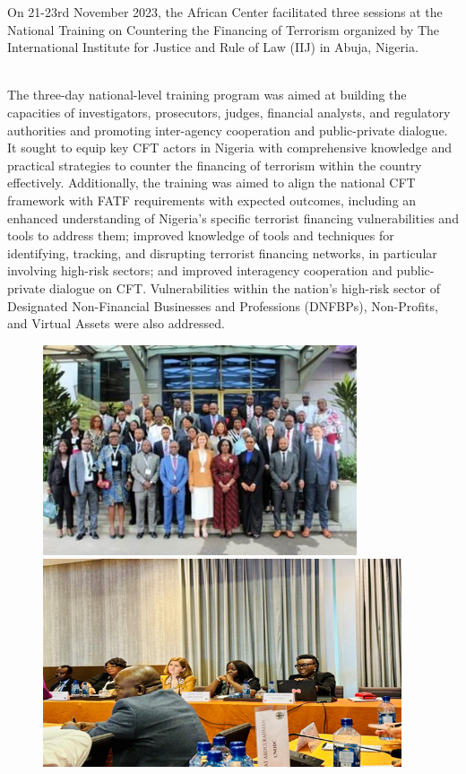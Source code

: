 \documentclass[
  letterpaper,
  DIV=11,
  numbers=noendperiod]{scrreprt}
\begin{document}
On 21-23rd November 2023, the African Center facilitated three sessions
at the National Training on Countering the Financing of Terrorism
organized by The International Institute for Justice and Rule of Law
(IIJ) in Abuja, Nigeria.\\
\strut ~\\
The three-day national-level training program was aimed at building the
capacities of investigators, prosecutors, judges, financial analysts,
and regulatory authorities and promoting inter-agency cooperation and
public-private dialogue. It sought to equip key CFT actors in Nigeria
with comprehensive knowledge and practical strategies to counter the
financing of terrorism within the country effectively. Additionally, the
training was aimed to align the national CFT framework with FATF
requirements with expected outcomes, including an enhanced understanding
of Nigeria's specific terrorist financing vulnerabilities and tools to
address them; improved knowledge of tools and techniques for
identifying, tracking, and disrupting terrorist financing networks, in
particular involving high-risk sectors; and improved interagency
cooperation and public-private dialogue on CFT. Vulnerabilities within
the nation's high-risk sector of Designated Non-Financial Businesses and
Professions (DNFBPs), Non-Profits, and Virtual Assets were also
addressed.

\begin{figure}

\begin{minipage}{0.47\linewidth}
\includegraphics[width=3.64583in,height=\textheight,keepaspectratio]{images/strengthen/01_bwari.jpg}\end{minipage}%
%
\begin{minipage}{0.53\linewidth}
\includegraphics[width=4.16667in,height=\textheight,keepaspectratio]{images/strengthen/01_2_bwari.png}\end{minipage}%

\end{figure}%
\end{document}
